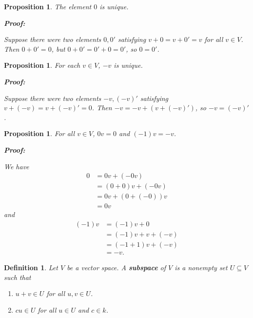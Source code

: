 \documentclass{article}
\theoremstyle{colontheorem}
\newtheorem{proposition}[theorem]{Proposition}
\newtheorem{definition}[theorem]{Definition}
\newenvironment{Proposition}
{
	\begin{mdframed}[backgroundcolor=PropPink!10]
	\begin{proposition}
}
{
	\end{proposition}
	\end{mdframed}
	
	\vspace{.15in}
}
\newenvironment{Def}
{
	\begin{mdframed}[backgroundcolor=DefGreen!10]
	\begin{definition}
}
{
	\end{definition}
	\end{mdframed}
	
	\vspace{.15in}
}
\newenvironment{Proof}
{
	\begin{mdframed}[backgroundcolor=ProofPurple!10]
	\textbf{Proof:}%
}
{
	\end{mdframed}
	
	\vspace{.085in}
}
\begin{document}
\begin{Proposition}
	
	The element $0$ is unique.
	
	\begin{Proof}
		Suppose there were two elements $0, 0'$ satisfying $v + 0 = v + 0' = v$ for all $v \in V$. Then $0 + 0' = 0$, but $0 + 0' = 0' + 0 = 0'$, so $0 = 0'$. 
		
	\end{Proof}
	
\end{Proposition}



\begin{Proposition}
	
	For each $v \in V$, $-v$ is unique.
	
	\begin{Proof}
		Suppose there were two elements $-v, (-v)'$ satisfying $v + (-v) = v + (-v)' = 0$. Then $-v = -v + (v+(-v)')$, so $-v = (-v)'$.
		
	\end{Proof}
	
\end{Proposition}



\begin{Proposition}
	
	For all $v \in V$, $0v = 0$ and $(-1)v = -v$.
	
	\begin{Proof}
		We have 
		\begin{align*}
		0 &= 0v + (-0v)\\
		&= (0 + 0)v + (-0v)\\
		&= 0v + (0 + (-0))v\\
		&= 0v
		\end{align*} and \begin{align*}
		(-1)v &= (-1)v + 0\\
		&= (-1)v + v + (-v)\\
		&= (-1 + 1)v + (-v)\\
		&= -v.
		\end{align*}
		
	\end{Proof}
	
\end{Proposition}



\begin{Def}
	
	Let $V$ be a vector space. A \textbf{subspace} of $V$ is a nonempty set $U \subseteq V$ such that
	
	\begin{enumerate}
		
		\item $u+v \in U$ for all $u,v \in U$.
		\item $cu \in U$ for all $u \in U$ and $c \in k$.
		
	\end{enumerate}
	
\end{Def}
\end{document}
